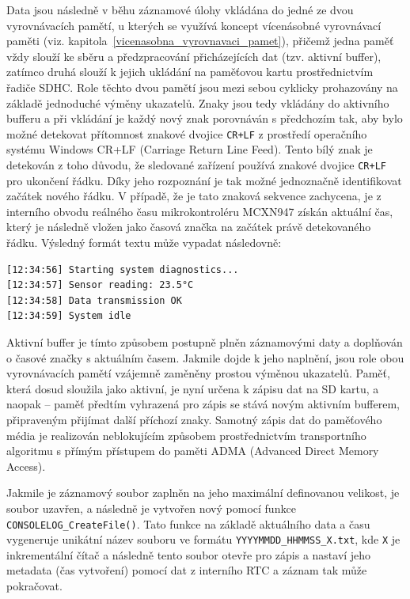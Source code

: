 Data jsou následně v běhu záznamové úlohy vkládána do jedné ze dvou vyrovnávacích pamětí, u kterých se využívá koncept vícenásobné vyrovnávací paměti (viz. kapitola~\ref{vicenasobna_vyrovnavaci_pamet}), přičemž jedna paměť vždy slouží ke sběru a předzpracování přicházejících dat (tzv. aktivní buffer), zatímco druhá slouží k jejich ukládání na paměťovou kartu prostřednictvím řadiče SDHC. Role těchto dvou pamětí jsou mezi sebou cyklicky prohazovány na základě jednoduché výměny ukazatelů. Znaky jsou tedy vkládány do aktivního bufferu a při vkládání je každý nový znak porovnáván s předchozím tak, aby bylo možné detekovat přítomnost znakové dvojice \texttt{CR+LF} z prostředí operačního systému Windows CR+LF (Carriage Return Line Feed). Tento bílý znak je detekován z toho důvodu, že sledované zařízení používá znakové dvojice \texttt{CR+LF} pro ukončení řádku. Díky jeho rozpoznání je tak možné jednoznačně identifikovat začátek nového řádku. V případě, že je tato znaková sekvence zachycena, je z interního obvodu reálného času mikrokontroléru MCXN947 získán aktuální čas, který je následně vložen jako časová značka na začátek právě detekovaného řádku. Výsledný formát textu může vypadat následovně:

\begin{verbatim}
[12:34:56] Starting system diagnostics...
[12:34:57] Sensor reading: 23.5°C
[12:34:58] Data transmission OK
[12:34:59] System idle
\end{verbatim}

Aktivní buffer je tímto způsobem postupně plněn záznamovými daty a doplňován o časové značky s aktuálním časem. Jakmile dojde k jeho naplnění, jsou role obou vyrovnávacích pamětí vzájemně zaměněny prostou výměnou ukazatelů. Paměť, která dosud sloužila jako aktivní, je nyní určena k zápisu dat na SD kartu, a naopak – paměť předtím vyhrazená pro zápis se stává novým aktivním bufferem, připraveným přijímat další příchozí znaky. Samotný zápis dat do paměťového média je realizován neblokujícím způsobem prostřednictvím transportního algoritmu s přímým přístupem do paměti ADMA (Advanced Direct Memory Access). \cite{nxp_MCX_Nx4x_Reference_Manual}

Jakmile je záznamový soubor zaplněn na jeho maximální definovanou velikost, je soubor uzavřen, a následně je vytvořen nový pomocí funkce \texttt{CONSOLELOG\_CreateFile()}. Tato funkce na základě aktuálního data a času vygeneruje unikátní název souboru ve formátu \texttt{YYYYMMDD\_HHMMSS\_X.txt}, kde \texttt{X} je inkrementální čítač a následně tento soubor otevře pro zápis a nastaví jeho metadata (čas vytvoření) pomocí dat z interního RTC a záznam tak může pokračovat.

